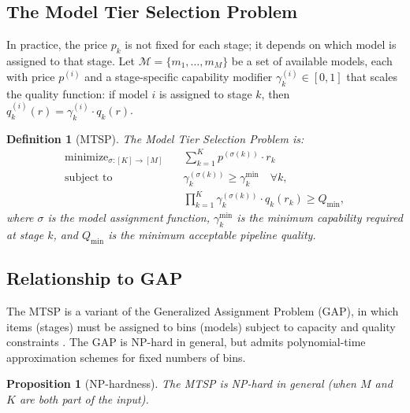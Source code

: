 \documentclass[11pt, a4paper, copyright]{googledeepmind}
\DeclareMathOperator*{\minimize}{minimize}
\newtheorem{definition}{Definition}[section]
\newtheorem{proposition}{Proposition}[section]
\begin{document}
\subsection{The Model Tier Selection Problem}

In practice, the price $p_k$ is not fixed for each stage; it depends on which model is assigned to that stage. Let $\mathcal{M} = \{m_1, \ldots, m_M\}$ be a set of available models, each with price $p^{(i)}$ and a stage-specific capability modifier $\gamma_k^{(i)} \in [0,1]$ that scales the quality function: if model $i$ is assigned to stage $k$, then $q_k^{(i)}(r) = \gamma_k^{(i)} \cdot q_k(r)$.

\begin{definition}[MTSP]\label{def:mtsp}
The \emph{Model Tier Selection Problem} is:
\begin{equation}\label{eq:mtsp}
\begin{aligned}
    \minimize_{\sigma: [K] \to [M]} \quad & \sum_{k=1}^{K} p^{(\sigma(k))} \cdot r_k \\
    \text{subject to} \quad & \gamma_k^{(\sigma(k))} \geq \gamma_k^{\min} \quad \forall k, \\
    & \prod_{k=1}^{K} \gamma_k^{(\sigma(k))} \cdot q_k(r_k) \geq Q_{\min},
\end{aligned}
\end{equation}
where $\sigma$ is the model assignment function, $\gamma_k^{\min}$ is the minimum capability required at stage $k$, and $Q_{\min}$ is the minimum acceptable pipeline quality.
\end{definition}

\subsection{Relationship to GAP}

The MTSP is a variant of the Generalized Assignment Problem (GAP), in which items (stages) must be assigned to bins (models) subject to capacity and quality constraints \citep{chekuri2005}. The GAP is NP-hard in general, but admits polynomial-time approximation schemes for fixed numbers of bins.

\begin{proposition}[NP-hardness]\label{prop:np-hard}
The MTSP is NP-hard in general (when $M$ and $K$ are both part of the input).
\end{proposition}
\end{document}
